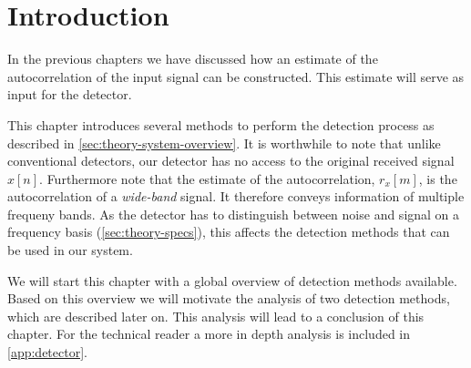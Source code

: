\documentclass[a4paper, openany, oneside]{memoir}
\begin{document}
\section{Introduction}
In the previous chapters we have discussed how an estimate of the autocorrelation of the input signal can be constructed. This estimate will serve
as input for the detector.

This chapter introduces several methods to perform the detection process as described in \cref{sec:theory-system-overview}. It is worthwhile to note that unlike conventional detectors, our detector has no access to the original received signal $x[n]$. Furthermore note that the estimate of the autocorrelation, $r_x[m]$, is the autocorrelation of a \emph{wide-band} signal. It therefore conveys information of multiple frequeny bands. As the detector has to distinguish between noise and signal on a frequency basis (\cref{sec:theory-specs}), this affects the detection methods that can be used in our system.  

We will start this chapter with a global overview of detection methods available. Based on this overview we will motivate the analysis of two detection methods, which are described later on. This analysis will lead to a conclusion of this chapter. For the technical reader a more in depth analysis is included in \cref{app:detector}.
\end{document}
